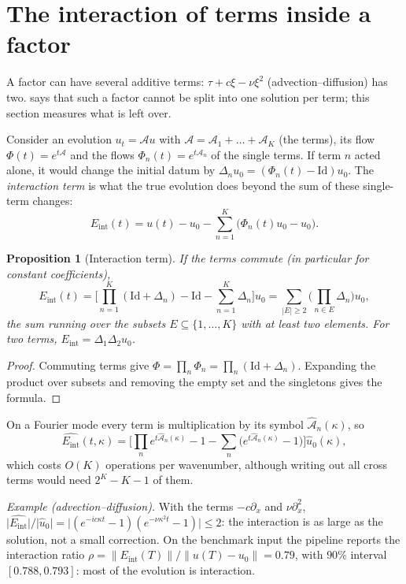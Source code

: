 \documentclass[11pt]{article}
\theoremstyle{plain}
\newtheorem{proposition}[theorem]{Proposition}
\theoremstyle{definition}
\theoremstyle{remark}
\newcommand{\Id}{\mathrm{Id}}
\newcommand{\Eint}{E_{\mathrm{int}}}        %
\newcommand{\flow}{\Phi}                    %
\newcommand{\abs}[1]{\lvert#1\rvert}
\newcommand{\norm}[1]{\lVert#1\rVert}
\begin{document}
\section{The interaction of terms inside a factor}\label{sm:interaction}
A factor can have several additive terms: $\tau+c\xi-\nu\xi^2$ (advection--diffusion) has two.  says
that such a factor cannot be split into one solution per term; this section measures what is left over.

Consider an evolution $u_t=\mathcal Au$ with $\mathcal A=\mathcal A_1+\dots+\mathcal A_K$ (the terms), its flow
$\flow(t)=e^{t\mathcal A}$ and the flows $\flow_n(t)=e^{t\mathcal A_n}$ of the single terms. If term $n$ acted alone, it
would change the initial datum by $\Delta_nu_0=(\flow_n(t)-\Id)u_0$. The \emph{interaction term} is what the true
evolution does beyond the sum of these single-term changes:
\begin{equation}\label{sm:eq:eint}
  \Eint(t)=u(t)-u_0-\sum_{n=1}^K\big(\flow_n(t)u_0-u_0\big).
\end{equation}
\begin{proposition}[Interaction term]\label{sm:prop:eint}
If the terms commute (in particular for constant coefficients),
\[
  \Eint(t)=\Big[\prod_{n=1}^K(\Id+\Delta_n)-\Id-\sum_{n=1}^K\Delta_n\Big]u_0=\sum_{|E|\ge2}\Big(\prod_{n\in E}\Delta_n\Big)u_0 ,
\]
the sum running over the subsets $E\subseteq\{1,\dots,K\}$ with at least two elements. For two terms,
$\Eint=\Delta_1\Delta_2u_0$.
\end{proposition}
\begin{proof}
Commuting terms give $\flow=\prod_n\flow_n=\prod_n(\Id+\Delta_n)$. Expanding the product over subsets and removing the
empty set and the singletons gives the formula.
\end{proof}
On a Fourier mode every term is multiplication by its symbol $\hat{\mathcal A}_n(\kappa)$, so
\[
  \widehat{\Eint}(t,\kappa)=\Big[\prod_ne^{t\hat{\mathcal A}_n(\kappa)}-1-\sum_n\big(e^{t\hat{\mathcal A}_n(\kappa)}-1\big)\Big]\hat u_0(\kappa),
\]
which costs $O(K)$ operations per wavenumber, although writing out all cross terms would need $2^K-K-1$ of them.

\emph{Example (advection--diffusion).} With the terms $-c\partial_x$ and $\nu\partial_x^2$,
$\abs{\widehat{\Eint}}/\abs{\hat u_0}=\abs{(e^{-ic\kappa t}-1)(e^{-\nu\kappa^2t}-1)}\le2$: the interaction is as large as the
solution, not a small correction. On the benchmark input the pipeline reports the interaction ratio
$\rho=\norm{\Eint(T)}/\norm{u(T)-u_0}=0.79$, with $90\%$ interval $[0.788,0.793]$: most of the evolution is interaction.
\end{document}
